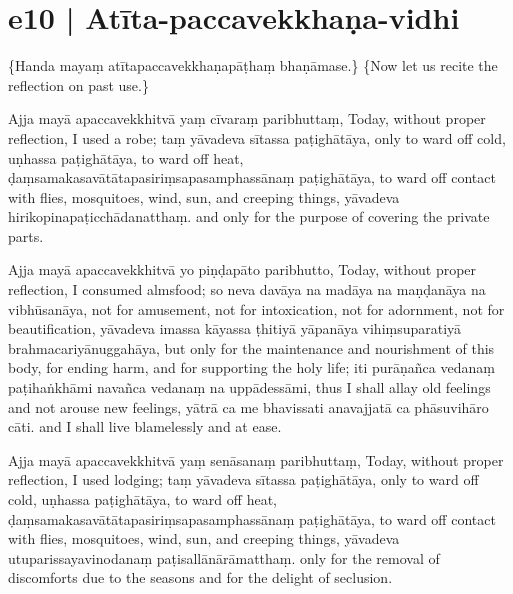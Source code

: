 \section*{e10 | Atīta-paccavekkhaṇa-vidhi}

\begin{chantsubsection}
  \chantnote
    {\{Handa mayaṃ atītapaccavekkhaṇapāṭhaṃ bhaṇāmase.\}}
  \chantnotetrans
    {\{Now let us recite the reflection on past use.\}}

\chantgap
  \chantlineinline
    {Ajja mayā apaccavekkhitvā yaṃ cīvaraṃ paribhuttaṃ,}
    {Today, without proper reflection, I used a robe;}
  \chantlineinline
    {taṃ yāvadeva sītassa paṭighātāya,}
    {only to ward off cold,}
  \chantlineinline
    {uṇhassa paṭighātāya,}
    {to ward off heat,}
  \chantlineinline
    {ḍaṃsamakasavātātapasiriṃsapasamphassānaṃ paṭighātāya,}
    {to ward off contact with flies, mosquitoes, wind, sun, and creeping things,}
  \chantlineinline
    {yāvadeva hirikopinapaṭicchādanatthaṃ.}
    {and only for the purpose of covering the private parts.}

\chantgap

  \chantlineinline
    {Ajja mayā apaccavekkhitvā yo piṇḍapāto paribhutto,}
    {Today, without proper reflection, I consumed almsfood;}
  \chantlineinline
    {so neva davāya na madāya na maṇḍanāya na vibhūsanāya,}
    {not for amusement, not for intoxication, not for adornment, not for beautification,}
  \chantlineinline
    {yāvadeva imassa kāyassa ṭhitiyā yāpanāya vihiṃsuparatiyā brahmacariyānuggahāya,}
    {but only for the maintenance and nourishment of this body, for ending harm, and for supporting the holy life;}
  \chantlineinline
    {iti purāṇañca vedanaṃ paṭihaṅkhāmi navañca vedanaṃ na uppādessāmi,}
    {thus I shall allay old feelings and not arouse new feelings,}
  \chantlineinline
    {yātrā ca me bhavissati anavajjatā ca phāsuvihāro cāti.}
    {and I shall live blamelessly and at ease.}

\chantgap

  \chantlineinline
    {Ajja mayā apaccavekkhitvā yaṃ senāsanaṃ paribhuttaṃ,}
    {Today, without proper reflection, I used lodging;}
  \chantlineinline
    {taṃ yāvadeva sītassa paṭighātāya,}
    {only to ward off cold,}
  \chantlineinline
    {uṇhassa paṭighātāya,}
    {to ward off heat,}
  \chantlineinline
    {ḍaṃsamakasavātātapasiriṃsapasamphassānaṃ paṭighātāya,}
    {to ward off contact with flies, mosquitoes, wind, sun, and creeping things,}
  \chantlineinline
    {yāvadeva utuparissayavinodanaṃ paṭisallānārāmatthaṃ.}
    {only for the removal of discomforts due to the seasons and for the delight of seclusion.}


\end{chantsubsection}
